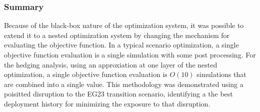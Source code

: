 \subsubsection{Summary}

Because of the black-box nature of the \Cyclus optimization system, it was
possible to extend it to a nested optimization system by changing the
mechanism for evaluating the objective function.  In a typical scenario
optimization, a single objective function evaluation is a single \Cyclus{}
simulation with some post processing.  For the hedging analysis, using an
approxiation at one layer of the nested optimization, a single objective
function evaluation is $O(10)$ \Cyclus simulations that are combined into a
single value.  This methodology was demonstrated using a poisitted disruption
to the EG23 transition scenario, identifying a the best deployment history for
minimizing the exposure to that disruption.
